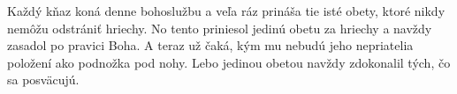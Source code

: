 Každý kňaz koná denne bohoslužbu a veľa ráz prináša tie isté obety, ktoré nikdy nemôžu odstrániť hriechy.
No tento priniesol jedinú obetu za hriechy a navždy zasadol po pravici Boha.
A teraz už čaká, kým mu nebudú jeho nepriatelia položení ako podnožka pod nohy.
Lebo jedinou obetou navždy zdokonalil tých, čo sa posväcujú.